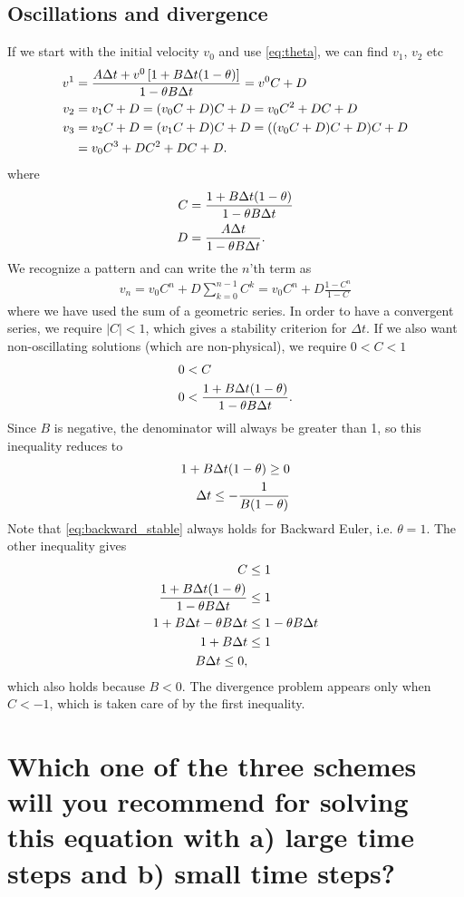 \documentclass[a4paper,10pt]{article}
\renewcommand{\(}{\left(}
\renewcommand{\)}{\right)}
\begin{document}
\subsection{Oscillations and divergence}
If we start with the initial velocity $v_0$ and use \eqref{eq:theta}, we can find $v_1$, $v_2$ etc
\begin{align*}
  v^1 &= {A\Delta t + v^0\left[1 + B\Delta t(1-\theta) \right] \over 1 - \theta B\Delta t} = v^0C + D\\
  v_2 &= v_1C + D = (v_0C + D)C + D = v_0C^2 + DC + D\\
  v_3 &= v_2C + D = (v_1C + D)C + D = ((v_0C + D)C + D)C + D\\
      &= v_0C^3 + DC^2 + DC + D.
\end{align*}
where
\begin{align*}
  C&={1 + B\Delta t(1-\theta)\over 1 - \theta B\Delta t}\\  
  D&={A\Delta t \over 1 - \theta B\Delta t}.
\end{align*}
We recognize a pattern and can write the $n$'th term as
\begin{align*}
  v_n = v_0 C^n + D\sum_{k=0}^{n-1}C^k = v_0C^n + D\frac{1 - C^n}{1 - C}
\end{align*}
where we have used the sum of a geometric series. In order to have a convergent series, we require $|C|<1$, which gives a stability criterion for $\Delta t$. If we also want non-oscillating solutions (which are non-physical), we require $0 < C < 1$
\begin{align*}
  0 &< C\\
  0 &< {1 + B\Delta t(1-\theta)\over 1 - \theta B\Delta t}.
\end{align*}
Since $B$ is negative, the denominator will always be greater than 1, so this inequality reduces to
\begin{align}
  \label{eq:backward_stable}
  1 + B\Delta t(1-\theta) \geq 0\\
  \nonumber
  \Delta t \leq -{1 \over B(1-\theta)}
\end{align}
Note that \eqref{eq:backward_stable} always holds for Backward Euler, i.e. $\theta = 1$. The other inequality gives
\begin{align*}
  C &\leq 1\\
  {1 + B\Delta t(1-\theta)\over 1 - \theta B\Delta t} &\leq 1\\
  1 + B\Delta t - \theta B\Delta t &\leq 1 - \theta B\Delta t\\
  1 + B\Delta t&\leq 1\\
  B\Delta t \leq 0,
\end{align*}
which also holds because $B<0$. The divergence problem appears only when $C < -1$, which is taken care of by the first inequality.
\section{Which one of the three schemes will you recommend for solving this equation with a) large time steps and b) small time steps?}
\end{document}
